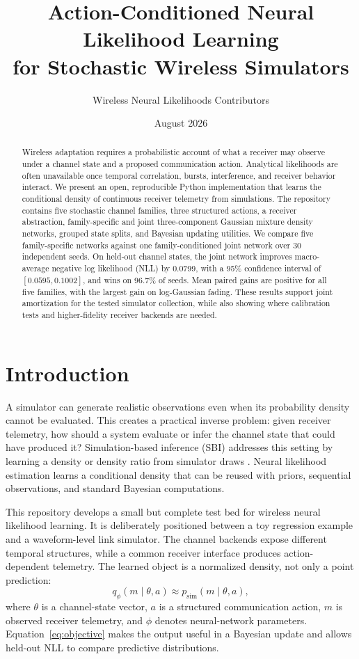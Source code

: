 \documentclass[10pt]{article}
\title{Action-Conditioned Neural Likelihood Learning\\for Stochastic Wireless Simulators}
\author{Wireless Neural Likelihoods Contributors}
\date{August 2026}
\begin{document}
\maketitle

\begin{abstract}
Wireless adaptation requires a probabilistic account of what a receiver may observe under a channel state and a proposed communication action. Analytical likelihoods are often unavailable once temporal correlation, bursts, interference, and receiver behavior interact. We present an open, reproducible Python implementation that learns the conditional density of continuous receiver telemetry from simulations. The repository contains five stochastic channel families, three structured actions, a receiver abstraction, family-specific and joint three-component Gaussian mixture density networks, grouped state splits, and Bayesian updating utilities. We compare five family-specific networks against one family-conditioned joint network over 30 independent seeds. On held-out channel states, the joint network improves macro-average negative log likelihood (NLL) by 0.0799, with a 95\% confidence interval of $[0.0595,0.1002]$, and wins on 96.7\% of seeds. Mean paired gains are positive for all five families, with the largest gain on log-Gaussian fading. These results support joint amortization for the tested simulator collection, while also showing where calibration tests and higher-fidelity receiver backends are needed.
\end{abstract}

\section{Introduction}

A simulator can generate realistic observations even when its probability density cannot be evaluated. This creates a practical inverse problem: given receiver telemetry, how should a system evaluate or infer the channel state that could have produced it? Simulation-based inference (SBI) addresses this setting by learning a density or density ratio from simulator draws \cite{cranmer2020frontier}. Neural likelihood estimation learns a conditional density that can be reused with priors, sequential observations, and standard Bayesian computations.

This repository develops a small but complete test bed for wireless neural likelihood learning. It is deliberately positioned between a toy regression example and a waveform-level link simulator. The channel backends expose different temporal structures, while a common receiver interface produces action-dependent telemetry. The learned object is a normalized density, not only a point prediction:
\begin{equation}
  q_{\phi}(m\mid\theta,a) \approx p_{\mathrm{sim}}(m\mid\theta,a),
  \label{eq:objective}
\end{equation}
where $\theta$ is a channel-state vector, $a$ is a structured communication action, $m$ is observed receiver telemetry, and $\phi$ denotes neural-network parameters. Equation~\eqref{eq:objective} makes the output useful in a Bayesian update and allows held-out NLL to compare predictive distributions.
\end{document}
